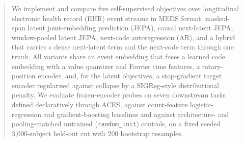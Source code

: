 \documentclass[11pt,a4paper]{article}
\newcommand{\code}[1]{\texttt{\small #1}}
\begin{document}
\begin{abstract}
\noindent
We implement and compare five self-supervised objectives over longitudinal
electronic health record (EHR) event streams in MEDS format: masked-span
latent joint-embedding prediction (JEPA), causal next-latent JEPA,
window-pooled latent JEPA, next-code autoregression (AR), and a hybrid that
carries a dense next-latent term and the next-code term through one trunk. All
variants share an event embedding that fuses a learned code embedding with a
value quantizer and Fourier time features, a rotary-position encoder, and, for
the latent objectives, a stop-gradient target encoder regularized against
collapse by a SIGReg-style distributional penalty. We evaluate frozen-encoder
probes on seven downstream tasks defined declaratively through ACES, against
count-feature logistic-regression and gradient-boosting baselines and against
architecture- and pooling-matched untrained (\code{random\_init}) controls, on
a fixed seeded 3{,}000-subject held-out cut with 200 bootstrap resamples.


\end{abstract}
\end{document}
